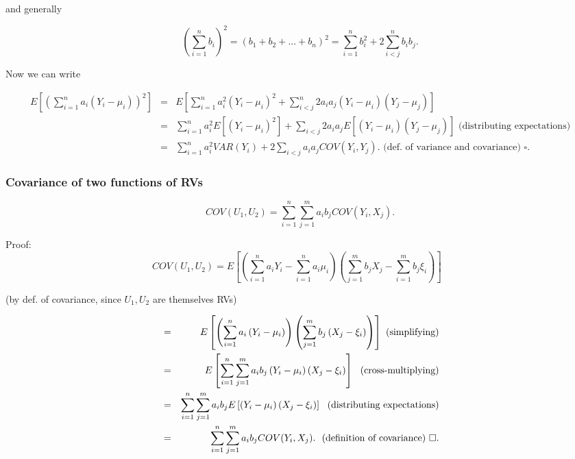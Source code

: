 \documentclass[11pt]{article}
\begin{document}
and generally

\begin{equation*}
\left( \sum_{i=1}^{n}b_{i}\right) ^{2}=\left( b_{1}+b_{2}+...+b_{n}\right)
^{2}=\sum_{i=1}^{n}b_{i}^{2}+2\sum_{i<j}^{n}b_{i}b_{j}.
\end{equation*}

\medskip Now we can write

\begin{eqnarray*}
E\left[ \left( \sum_{i=1}^{n}a_{i}\left( Y_{i}-\mu _{i}\right) \right) ^{2}%
\right] &=&E\left[ \sum_{i=1}^{n}a_{i}^{2}\left( Y_{i}-\mu _{i}\right)
^{2}+\sum_{i<j}^{n}2a_{i}a_{j}\left( Y_{i}-\mu _{i}\right) \left( Y_{j}-\mu
_{j}\right) \right] \\
&=&\sum_{i=1}^{n}a_{i}^{2}E\left[ \left( Y_{i}-\mu _{i}\right) ^{2}\right]
+\sum_{i<j}2a_{i}a_{j}E\left[ \left( Y_{i}-\mu _{i}\right) \left( Y_{j}-\mu
_{j}\right) \right] \text{ \ (distributing expectations)} \\
&=&\sum_{i=1}^{n}a_{i}^{2}VAR(Y_{i})+2\sum_{i<j}a_{i}a_{j}COV(Y_{i},Y_{j}).%
\text{ \ (def. of variance and covariance) }\square .
\end{eqnarray*}%
\newpage

\subsubsection{Covariance of two functions of RVs\protect\bigskip}

\begin{equation*}
COV(U_{1},U_{2})=\sum_{i=1}^{n}\sum_{j=1}^{m}a_{i}b_{j}COV(Y_{i},X_{j}). 
\tag{3}
\end{equation*}

Proof:%
\begin{equation*}
COV(U_{1},U_{2})=E\left[ \left(
\sum_{i=1}^{n}a_{i}Y_{i}-\sum_{i=1}^{n}a_{i}\mu _{i}\right) \left(
\sum_{j=1}^{m}b_{j}X_{j}-\sum_{i=1}^{m}b_{j}\xi _{i}\right) \right] \text{ }
\end{equation*}

\begin{center}
(by def. of covariance, since $U_{1},U_{2}$ are themselves RVs)
\end{center}

\begin{eqnarray*}
&=&E\left[ \left( \sum_{i=1}^{n}a_{i}\left( Y_{i}-\mu _{i}\right) \right)
\left( \sum_{j=1}^{m}b_{j}\left( X_{j}-\xi _{i}\right) \right) \right] \text{
(simplifying)} \\
&=&E\left[ \sum_{i=1}^{n}\sum_{j=1}^{m}a_{i}b_{j}\left( Y_{i}-\mu
_{i}\right) \left( X_{j}-\xi _{i}\right) \right] \text{ \ (cross-multiplying)%
} \\
&=&\sum_{i=1}^{n}\sum_{j=1}^{m}a_{i}b_{j}E\left[ \left( Y_{i}-\mu
_{i}\right) \left( X_{j}-\xi _{i}\right) \right] \text{ \ (distributing
expectations)} \\
&=&\sum_{i=1}^{n}\sum_{j=1}^{m}a_{i}b_{j}COV(Y_{i},X_{j}).\text{ \
(definition of covariance) }\square .
\end{eqnarray*}
\end{document}
